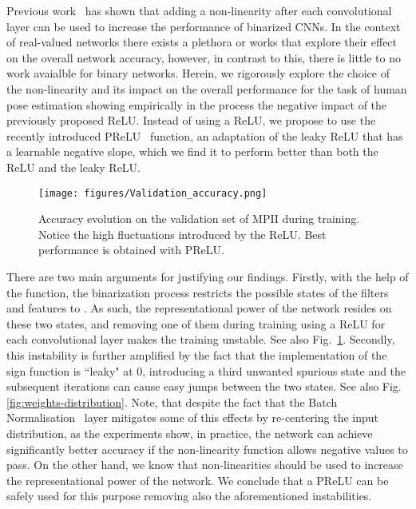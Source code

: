 \documentclass[10pt,twocolumn,letterpaper]{article}
\begin{document}
Previous work~\cite{rastegari2016xnor,bulat2017binarized} has shown that adding a non-linearity after each convolutional layer can be used to increase the  performance of binarized CNNs. In the context of real-valued networks there exists a plethora or works that explore their effect on the overall network accuracy, however, in contrast to this, there is little to no work avaialble for binary networks.  Herein, we rigorously explore the choice of the non-linearity and its impact on the overall performance for the task of human pose estimation showing empirically in the process the negative impact of the previously proposed ReLU. Instead of using a ReLU, we propose to use the recently introduced PReLU~\cite{he2015delving} function, an adaptation of the leaky ReLU that has a learnable negative slope,  which we find it to perform better than both the ReLU and the leaky ReLU. 

\begin{figure}[!htbp]
    \centering
    \texttt{[image: figures/Validation\_accuracy.png]}
    \caption{Accuracy evolution on the validation set of MPII during training. Notice the high fluctuations introduced by the ReLU. Best performance is obtained with PReLU.}
    \label{fig:validation-accuracy-main}
\end{figure}

There are two main arguments for justifying our findings. Firstly, with the help of the  function, the binarization process restricts the possible states of the filters and features to . As such, the representational power of the network resides on these two states, and removing one of them during training using a ReLU for each convolutional layer makes the training unstable. See also Fig.~\ref{fig:validation-accuracy-main}. Secondly, this instability is further amplified  by the fact that the implementation of the sign function is ``leaky" at 0, introducing a third unwanted spurious state and the subsequent iterations can cause easy jumps between the two states. See also Fig. \ref{fig:weights-distribution}. Note, that despite the fact that the Batch Normalisation~\cite{ioffe2015batch} layer mitigates some of this effects by re-centering the input distribution, as the experiments show, in practice, the network can achieve significantly better accuracy if the non-linearity function allows negative values to pass. On the other hand, we know that non-linearities should be used to increase the representational power of the network. We conclude that a PReLU can be safely used for this purpose removing also the aforementioned instabilities. 
\end{document}
